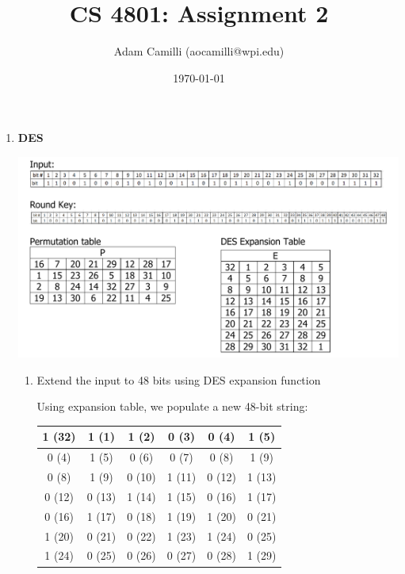 \documentclass[12pt]{article}
\newenvironment{answer}
{ \begin{tcolorbox}[halign=left]
    }
    {  
  \end{tcolorbox}
}
\begin{document}
\title{CS 4801: Assignment 2}
\author{Adam Camilli (aocamilli@wpi.edu)}
\date{\today}
\maketitle

\begin{enumerate}

\item \textbf{DES}
\\

    \centerline{\includegraphics[width=1.3\textwidth]{pictures/DES}}
    \newpage
    \begin{enumerate}
    \item Extend the input to 48 bits using DES expansion function
      \begin{answer}
        Using expansion table, we populate a new 48-bit string:
        \begin{center}
          \begin{tabular}{|c|c|c|c|c|c|}
          \hline
          1 (32) & 1 (1) & 1 (2) & 0 (3) & 0 (4) & 1 (5) \\ 
          \hline
          0 (4) & 1 (5) & 0 (6) & 0 (7) & 0 (8) & 1 (9) \\ 
          \hline
          0 (8) & 1 (9) & 0 (10) & 1 (11) & 0 (12) & 1 (13) \\ 
          \hline
          0 (12) & 0 (13) & 1 (14) & 1 (15) & 0 (16) & 1 (17) \\ 
          \hline
          0 (16) & 1 (17) & 0 (18) & 1 (19) & 1 (20) & 0 (21) \\ 
          \hline
          1 (20) & 0 (21) & 0 (22) & 1 (23) & 1 (24) & 0 (25) \\ 
          \hline
          1 (24) & 0 (25) & 0 (26) & 0 (27) & 0 (28) & 1 (29) \\ 

\end{tabular}
\end{center}
\end{answer}
\end{enumerate}
\end{enumerate}
\end{document}
